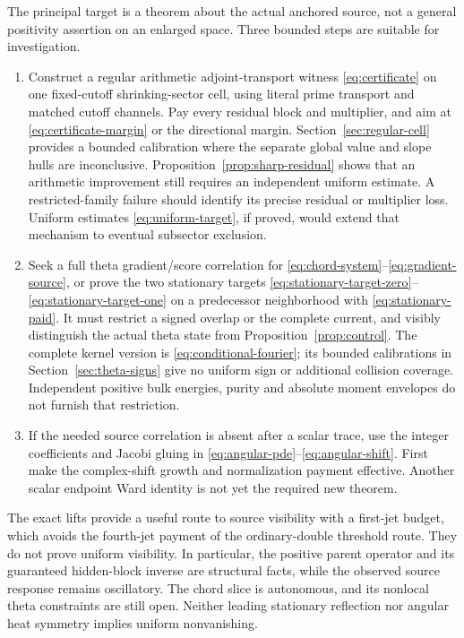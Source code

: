 \documentclass[11pt]{article}
\theoremstyle{definition}
\theoremstyle{remark}
\begin{document}
The principal target is a theorem about the actual anchored source,
not a general positivity assertion on an enlarged space. Three bounded
steps are suitable for investigation.
\begin{enumerate}
 \item Construct a regular arithmetic adjoint-transport witness
 \eqref{eq:certificate} on one fixed-cutoff shrinking-sector cell, using
 literal prime transport and matched cutoff channels. Pay every residual
 block and multiplier, and aim at \eqref{eq:certificate-margin} or the
 directional margin. Section~\ref{sec:regular-cell} provides a bounded
 calibration where the separate global value and slope hulls are
 inconclusive. Proposition~\ref{prop:sharp-residual} shows that an
 arithmetic improvement still requires an independent uniform estimate.
 A restricted-family failure should identify its precise residual or
 multiplier loss. Uniform estimates \eqref{eq:uniform-target}, if proved,
 would extend that mechanism to eventual subsector exclusion.
 \item Seek a full theta gradient/score correlation for
 \eqref{eq:chord-system}--\eqref{eq:gradient-source}, or prove the two
 stationary targets \eqref{eq:stationary-target-zero}--\eqref{eq:stationary-target-one}
 on a predecessor neighborhood with \eqref{eq:stationary-paid}. It must restrict a
 signed overlap or the complete current, and visibly distinguish the
 actual theta state from Proposition~\ref{prop:control}. The complete
 kernel version is \eqref{eq:conditional-fourier}; its bounded
 calibrations in Section~\ref{sec:theta-signs} give no uniform sign
 or additional collision coverage. Independent positive bulk energies,
 purity and absolute moment envelopes do not furnish that restriction.
 \item If the needed source correlation is absent after a scalar trace,
 use the integer coefficients and Jacobi gluing in
 \eqref{eq:angular-pde}--\eqref{eq:angular-shift}. First make the
 complex-shift growth and normalization payment effective. Another
 scalar endpoint Ward identity is not yet the required new theorem.
\end{enumerate}

The exact lifts provide a useful route to source visibility with a
first-jet budget, which avoids the fourth-jet payment of the ordinary-double
threshold route. They do not prove uniform visibility. In particular, the positive
parent operator and its guaranteed hidden-block inverse are structural
facts, while the observed source response remains oscillatory. The chord
slice is autonomous, and its nonlocal theta constraints are still open.
Neither leading stationary reflection nor angular heat symmetry implies
uniform nonvanishing.
\end{document}
